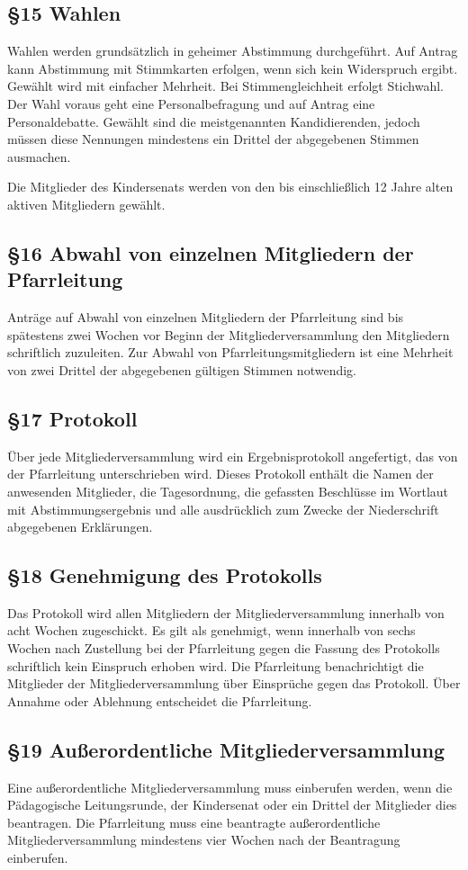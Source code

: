 \documentclass[12pt]{report}
\begin{document}
\begin{flushleft}
\subsection*{§15 Wahlen}
Wahlen werden grundsätzlich in geheimer Abstimmung durchgeführt. Auf Antrag kann Abstimmung mit
Stimmkarten erfolgen, wenn sich kein Widerspruch ergibt. Gewählt wird mit einfacher Mehrheit. Bei
Stimmengleichheit erfolgt Stichwahl. Der Wahl voraus geht eine Personalbefragung und auf Antrag eine
Personaldebatte. Gewählt sind die meistgenannten Kandidierenden, jedoch müssen diese Nennungen mindestens
ein Drittel der abgegebenen Stimmen ausmachen.

Die Mitglieder des Kindersenats werden von den bis einschließlich 12 Jahre alten aktiven Mitgliedern gewählt.
\subsection*{§16 Abwahl von einzelnen Mitgliedern der Pfarrleitung}
Anträge auf Abwahl von einzelnen Mitgliedern der Pfarrleitung sind bis spätestens zwei Wochen vor Beginn
der Mitgliederversammlung den Mitgliedern schriftlich zuzuleiten. Zur Abwahl von Pfarrleitungsmitgliedern
ist eine Mehrheit von zwei Drittel der abgegebenen gültigen Stimmen notwendig.
\subsection*{§17 Protokoll}
Über jede Mitgliederversammlung wird ein Ergebnisprotokoll angefertigt, das von der Pfarrleitung
unterschrieben wird. Dieses Protokoll enthält die Namen der anwesenden Mitglieder, die Tagesordnung, die
gefassten Beschlüsse im Wortlaut mit Abstimmungsergebnis und alle ausdrücklich zum Zwecke der Niederschrift
abgegebenen Erklärungen.
\subsection*{§18 Genehmigung des Protokolls}
Das Protokoll wird allen Mitgliedern der Mitgliederversammlung innerhalb von acht Wochen zugeschickt. Es
gilt als genehmigt, wenn innerhalb von sechs Wochen nach Zustellung bei der Pfarrleitung gegen die Fassung
des Protokolls schriftlich kein Einspruch erhoben wird. Die Pfarrleitung benachrichtigt die Mitglieder der
Mitgliederversammlung über Einsprüche gegen das Protokoll. Über Annahme oder Ablehnung entscheidet
die Pfarrleitung.
\subsection*{§19 Außerordentliche Mitgliederversammlung}
Eine außerordentliche Mitgliederversammlung muss einberufen werden, wenn die Pädagogische Leitungsrunde,
der Kindersenat oder ein Drittel der Mitglieder dies beantragen. Die Pfarrleitung muss eine beantragte
außerordentliche Mitgliederversammlung mindestens vier Wochen nach der Beantragung einberufen.

\end{flushleft}
\end{document}
